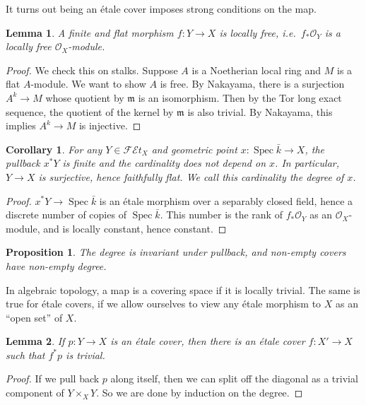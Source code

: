 \documentclass{shortart}
\newtheorem*{prop}{Proposition}
\newtheorem*{lemma}{Lemma}
\newtheorem*{cor}{Corollary}
\theoremstyle{definition}
\newcommand\FEt[1]{\mathscr{FE}t_{#1}}
\DeclareMathOperator\Spec{Spec}
\begin{document}
It turns out being an \'etale cover imposes strong conditions on the map.
\begin{lemma}
  A finite and flat morphism $f: Y \to X$ is locally free, i.e.\ $f_* \mathcal{O}_Y$ is a locally free $\mathcal{O}_X$-module.
\end{lemma}

\begin{proof}
  We check this on stalks. Suppose $A$ is a Noetherian local ring and $M$ is a flat $A$-module. We want to show $A$ is free. By Nakayama, there is a surjection $A^k \to M$ whose quotient by $\mathfrak{m}$ is an isomorphism. Then by the Tor long exact sequence, the quotient of the kernel by $\mathfrak{m}$ is also trivial. By Nakayama, this implies $A^k \to M$ is injective.
\end{proof}

\begin{cor}
  For any $Y \in \FEt{X}$ and geometric point $x: \Spec \bar{k} \to X$, the pullback $x^*Y$ is finite and the cardinality does not depend on $x$. In particular, $Y \to X$ is surjective, hence faithfully flat. We call this cardinality the \emph{degree} of $x$.
\end{cor}

\begin{proof}
  $x^*Y \to \Spec \bar{k}$ is an \'etale morphism over a separably closed field, hence a discrete number of copies of $\Spec \bar{k}$. This number is the rank of $f_* \mathcal{O}_Y$ as an $\mathcal{O}_X$-module, and is locally constant, hence constant.
\end{proof}

\begin{prop}
  The degree is invariant under pullback, and non-empty covers have non-empty degree.
\end{prop}

In algebraic topology, a map is a covering space if it is locally trivial. The same is true for \'etale covers, if we allow ourselves to view any \'etale morphism to $X$ as an ``open set'' of $X$.

\begin{lemma}
  If $p: Y \to X$ is an \'etale cover, then there is an \'etale cover $f: X' \to X$ such that $f^* p$ is trivial.
\end{lemma}

\begin{proof}
  If we pull back $p$ along itself, then we can split off the diagonal as a trivial component of $Y \times_X Y$. So we are done by induction on the degree.
\end{proof}
\end{document}
